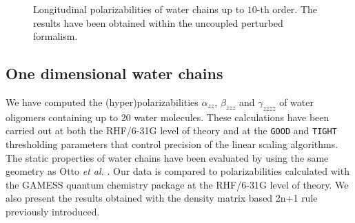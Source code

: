 \documentclass[prl,aps,letterpaper,twocolumn,showpacs,twocolumngrid,superbib]{revtex4}
\begin{document}
\begin{figure}[t]
  \caption{\protect
    Longitudinal polarizabilities of water chains up to $10$-th order.
    The results have been obtained within the uncoupled perturbed formalism.
  }\label{fig:10th order h2o}
\end{figure}


\subsection{One dimensional water chains}
We have computed the (hyper)polarizabilities $\alpha_{zz}$, 
$\beta_{zzz}$ and $\gamma_{zzzz}$ of water oligomers containing
up to 20 water molecules. These calculations have been carried out at
both the RHF/6-31G level of
theory and at the {\tt GOOD} and {\tt TIGHT} thresholding parameters 
that control precision of the linear scaling algorithms.
The static properties of water chains have been evaluated
by using the same geometry as Otto {\em et al.} \cite{POtto99}. 
Our data is compared to polarizabilities
calculated with the GAMESS quantum chemistry package \cite{gamess} 
at the RHF/6-31G level of theory.  We also
present the results obtained with the density matrix 
based 2n+1 rule previously introduced.
\end{document}
